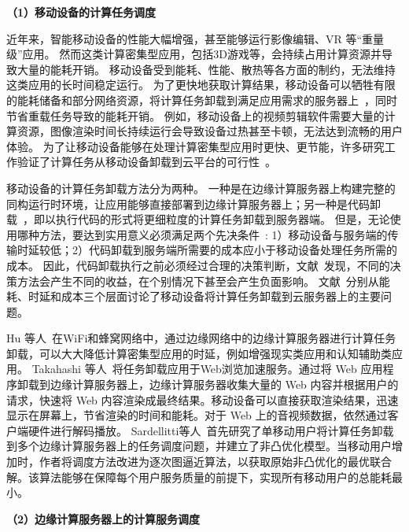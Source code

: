 \textbf{（1）移动设备的计算任务调度}

近年来，智能移动设备的性能大幅增强，甚至能够运行影像编辑、VR 等“重量级”应用。
然而这类计算密集型应用，包括3D游戏等，会持续占用计算资源并导致大量的能耗开销。
移动设备受到能耗、性能、散热等各方面的制约，无法维持这类应用的长时间稳定运行。
为了更快地获取计算结果，移动设备可以牺牲有限的能耗储备和部分网络资源，将计算任务卸载到满足应用需求的服务器上~\cite{DBLP:conf/ispa/KovachevYK12}，同时节省重载任务导致的能耗开销。
例如，移动设备上的视频剪辑软件需要大量的计算资源，图像渲染时间长持续运行会导致设备过热甚至卡顿，无法达到流畅的用户体验。
为了让移动设备能够在处理计算密集型应用时更快、更节能，许多研究工作验证了计算任务从移动设备卸载到云平台的可行性~\cite{DBLP:conf/secon/HassanXWC15,DBLP:journals/pervasive/SatyanarayananBCD09,DBLP:journals/computer/KumarL10}。

移动设备的计算任务卸载方法分为两种。
一种是在边缘计算服务器上构建完整的同构运行时环境，让应用能够直接部署到边缘计算服务器上；另一种是代码卸载~\cite{DBLP:conf/mobisys/CuervoBCWSCB10}，即以执行代码的形式将更细粒度的计算任务卸载到服务器端。
但是，无论使用哪种方法，要达到实用意义必须满足两个先决条件~\cite{Flores:2017bv}: 1）移动设备与服务端的传输时延较低；2）代码卸载到服务端所需要的成本应小于移动设备处理任务所需的成本。
因此，代码卸载执行之前必须经过合理的决策判断，文献~发现，不同的决策方法会产生不同的收益，在个别情况下甚至会产生负面影响。
文献~分别从能耗、时延和成本三个层面讨论了移动设备将计算任务卸载到云服务器上的主要问题。

Hu 等人~\cite{DBLP:conf/apsys/HuGHWACPS16}在WiFi和蜂窝网络中，通过边缘网络中的边缘计算服务器进行计算任务卸载，可以大大降低计算密集型应用的时延，例如增强现实类应用和认知辅助类应用。
Takahashi 等人~\cite{DBLP:conf/mobilecloud/TakahashiTK15}将任务卸载应用于Web浏览加速服务。通过将 Web 应用程序卸载到边缘计算服务器上，边缘计算服务器收集大量的 Web 内容并根据用户的请求，快速将 Web 内容渲染成最终结果。移动设备可以直接获取渲染结果，迅速显示在屏幕上，节省渲染的时间和能耗。对于 Web 上的音视频数据，依然通过客户端硬件进行解码播放。
Sardellitti等人~\cite{DBLP:journals/tsipn/SardellittiSB15}首先研究了单移动用户将计算任务卸载到多个边缘计算服务器上的任务调度问题，并建立了非凸优化模型。当移动用户增加时，作者将调度方法改进为逐次图逼近算法，以获取原始非凸优化的最优联合解。该算法能够在保障每个用户服务质量的前提下，实现所有移动用户的总能耗最小。

\textbf{（2）边缘计算服务器上的计算服务调度}

